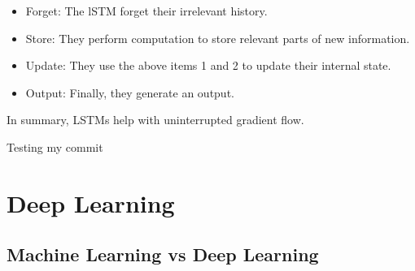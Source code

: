 \begin{itemize}
	\item Forget: The lSTM forget their irrelevant history.
	
	
	\item Store: They perform computation to store relevant parts of new information.
	
	
	\item Update: They use the above items 1 and 2 to update their internal state.
	
	
	\item Output: Finally, they generate an output.
\end{itemize}

In summary, LSTMs help with uninterrupted gradient flow.

Testing my commit

\section{Deep Learning}
\subsection{Machine Learning vs Deep Learning}
